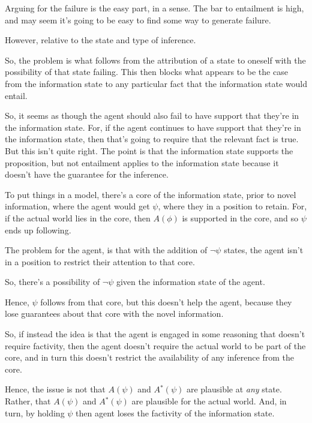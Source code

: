 \documentclass[10pt]{article}
\newcommand{\nf}[1]{#1\ensuremath{^{{*}}}}
\begin{document}
\begin{note}
  Arguing for the failure is the easy part, in a sense.
  The bar to entailment is high, and may seem it's going to be easy to find some way to generate failure.

  However, relative to the state and type of inference.

  So, the problem is what follows from the attribution of a state to oneself with the possibility of that state failing.
  This then blocks what appears to be the case from the information state to any particular fact that the information state would entail.

  So, it seems as though the agent should also fail to have support that they're in the information state.
  For, if the agent continues to have support that they're in the information state, then that's going to require that the relevant fact is true.
  But this isn't quite right.
  The point is that the information state supports the proposition, but not entailment applies to the information state because it doesn't have the guarantee for the inference.

  To put things in a model, there's a core of the information state, prior to novel information, where the agent would get \(\psi\), where they in a position to retain.
  For, if the actual world lies in the core, then \(A(\phi)\) is supported in the core, and so \(\psi\) ends up following.

  The problem for the agent, is that with the addition of \(\lnot\psi\) states, the agent isn't in a position to restrict their attention to that core.

  So, there's a possibility of \(\lnot\psi\) given the information state of the agent.

  Hence, \(\psi\) follows from that core, but this doesn't help the agent, because they lose guarantees about that core with the novel information.

  So, if instead the idea is that the agent is engaged in some reasoning that doesn't require factivity, then the agent doesn't require the actual world to be part of the core, and in turn this doesn't restrict the availability of any inference from the core.

  Hence, the issue is not that \(A(\psi)\) and \(\nf{A}(\psi)\) are plausible at \emph{any} state.
  Rather, that \(A(\psi)\) and \(\nf{A}(\psi)\) are plausible for the actual world.
  And, in turn, by holding \(\psi\) then agent loses the factivity of the information state.


\end{note}
\end{document}
